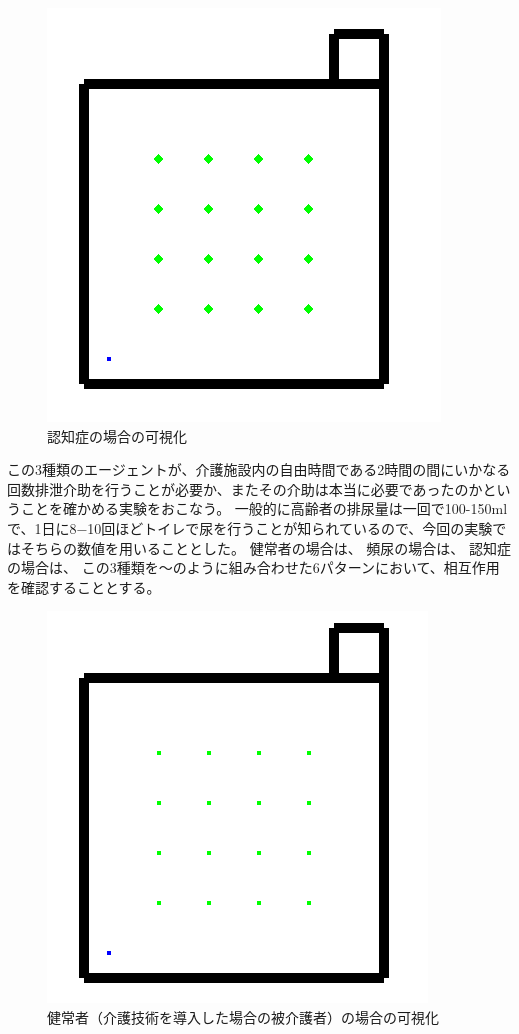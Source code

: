 \begin{figure}[htb]
\begin{center}
 \includegraphics[scale=0.6]{figures/elderly_v3.png}
 \caption[認知症の場合の可視化]{認知症の場合の可視化 \label{elderly_v3}}
\end{center}
\end{figure}

この3種類のエージェントが、介護施設内の自由時間である2時間の間にいかなる回数排泄介助を行うことが必要か、またその介助は本当に必要であったのかということを確かめる実験をおこなう。
一般的に高齢者の排尿量は一回で100-150mlで、1日に8−10回ほどトイレで尿を行うことが知られているので、今回の実験ではそちらの数値を用いることとした。
健常者の場合は、
頻尿の場合は、
認知症の場合は、
この3種類を〜のように組み合わせた6パターンにおいて、相互作用を確認することとする。

\begin{figure}[htb]
\begin{center}
 \includegraphics[scale=0.6]{figures/elderly_v1.png}
 \caption[健常者（介護技術を導入した場合の被介護者）の場合の可視化]{健常者（介護技術を導入した場合の被介護者）の場合の可視化 \label{elderly_v1}}
\end{center}
\end{figure}

